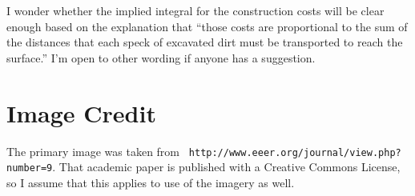 \documentclass[12pt]{article}
\begin{document}
I wonder whether the implied integral for the construction costs will
be clear enough based on the explanation that ``those costs are
proportional to the sum of the distances that each speck of excavated
dirt must be transported to reach the surface.'' I'm open to other
wording if anyone has a suggestion.


\section*{Image Credit}

The primary image was taken from {\tt
http://www.eeer.org/journal/view.php?number=9}. That academic paper is
published with a Creative Commons License, so I assume that this
applies to use of the imagery as well.
\end{document}
